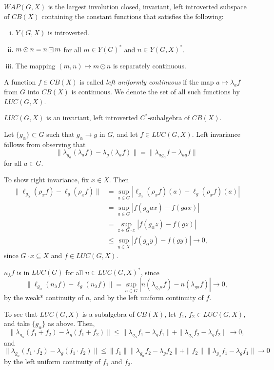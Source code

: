 \begin{corollary}
$WAP(G,X)$ is the largest involution closed, invariant, left introverted subspace of $CB(X)$
containing the constant functions that satisfies the following:
\begin{enumerate}[(i)]
\item $Y(G,X)$ is introverted.
\item $m\odot n = n\dotbox m$ for all $m\in Y(G)^*$ and $n\in Y(G,X)^*$.
\item The mapping $(m,n) \mapsto m\odot n$ is separately continuous.
\end{enumerate}
\end{corollary}

\begin{defn}
A function $f\in CB(X)$ is called {\it left uniformly continuous} if the
map $a\mapsto\lambda_a f$ from $G$ into $CB(X)$ is continuous.
We denote the set of all such functions by $LUC(G,X)$.
\end{defn}

\begin{lemma}
$LUC(G,X)$ is an invariant, left introverted $C^*$-subalgebra of $CB(X)$.
\end{lemma}
\proof
Let $\{g_\alpha\}\subset G$ such that $g_\alpha \rightarrow g$ in $G$, and let $f\in LUC(G,X)$.
Left invariance follows from observing that
\[
\|\lambda_{g_\alpha} (\lambda_a f) - \lambda_g (\lambda_a f) \| = \|\lambda_{ag_\alpha}f - \lambda_{ag}f\|
\]
for all $a\in G$.

To show right invariance, fix $x\in X$.  Then
\begin{align*}
\|\ell_{g_\alpha}(\rho_x f) - \ell_g (\rho_x f)\|
&= \sup_{a\in G} |\ell_{g_\alpha}(\rho_x f)(a) - \ell_g (\rho_x f)(a)| \\
&= \sup_{a\in G} |f(g_\alpha ax) - f(gax)| \\
&= \sup_{z\in G\cdot x} |f(g_\alpha z) - f(gz)| \\
&\leq \sup_{y\in X} |f(g_\alpha y) - f(gy)| \rightarrow 0,
\end{align*}
since $G\cdot x \subseteq X$ and $f\in LUC(G,X)$.

$n_\lambda f$ is in $LUC(G)$ for all $n\in LUC(G,X)^*$, since
\[
\|\ell_{g_\alpha} (n_\lambda f) - \ell_g(n_\lambda f)\| =
\sup_{a\in G} |n(\lambda_{{g_\alpha} a}f) - n(\lambda_{ga}f)| \rightarrow 0,
\]
by the weak* continuity of $n$, and by the left uniform continuity of $f$.

To see that $LUC(G,X)$ is a subalgebra of $CB(X)$, let $f_1$, $f_2 \in LUC(G,X)$, and
take $\{g_\alpha\}$ as above.
Then,
\[
\|\lambda_{g_\alpha}(f_1 + f_2) - \lambda_g(f_1 + f_2)\| \leq
\|\lambda_{g_\alpha}f_1 - \lambda_g f_1\| + \|\lambda_{g_\alpha}f_2 - \lambda_g f_2\| \rightarrow 0,
\]
and
\[
\|\lambda_{g_\alpha}(f_1\cdot f_2) - \lambda_g(f_1\cdot f_2)\| \leq
\|f_1\|\|\lambda_{g_\alpha}f_2 - \lambda_g f_2\| + \|f_2\|\|\lambda_{g_\alpha}f_1 - \lambda_g f_1\| \rightarrow 0
\]
by the left uniform continuity of $f_1$ and $f_2$.

